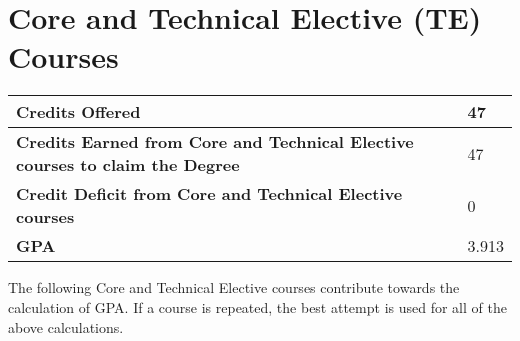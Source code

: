 \documentclass[12pt]{article}
\begin{document}
\section*{Core and Technical Elective (TE) Courses}

\begin{tabularx}{\textwidth}{|X|l|}
\hline 
\textbf{Credits Offered} & 47 \\ \hline 
\textbf{Credits Earned from Core and Technical Elective courses to claim the Degree} & 47 \\ \hline 
\textbf{Credit Deficit from Core and Technical Elective courses} & 0 \\
\hline 
\textbf{GPA} & 3.913 \\
\hline 
\end{tabularx}

\noindent The following Core and Technical Elective courses contribute towards the calculation of GPA. If a course is repeated, the best attempt is used for all of the above calculations.
\end{document}
